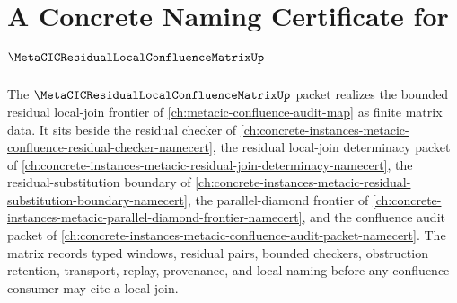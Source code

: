 \chapter{A Concrete Naming Certificate for $\MetaCICResidualLocalConfluenceMatrixUp$}
\label{ch:concrete-instances-metacic-residual-local-confluence-matrix-namecert}

The $\MetaCICResidualLocalConfluenceMatrixUp$ packet realizes the bounded residual local-join frontier of \autoref{ch:metacic-confluence-audit-map} as finite matrix data. It sits beside the residual checker of \autoref{ch:concrete-instances-metacic-confluence-residual-checker-namecert}, the residual local-join determinacy packet of \autoref{ch:concrete-instances-metacic-residual-join-determinacy-namecert}, the residual-substitution boundary of \autoref{ch:concrete-instances-metacic-residual-substitution-boundary-namecert}, the parallel-diamond frontier of \autoref{ch:concrete-instances-metacic-parallel-diamond-frontier-namecert}, and the confluence audit packet of \autoref{ch:concrete-instances-metacic-confluence-audit-packet-namecert}. The matrix records typed windows, residual pairs, bounded checkers, obstruction retention, transport, replay, provenance, and local naming before any confluence consumer may cite a local join.


